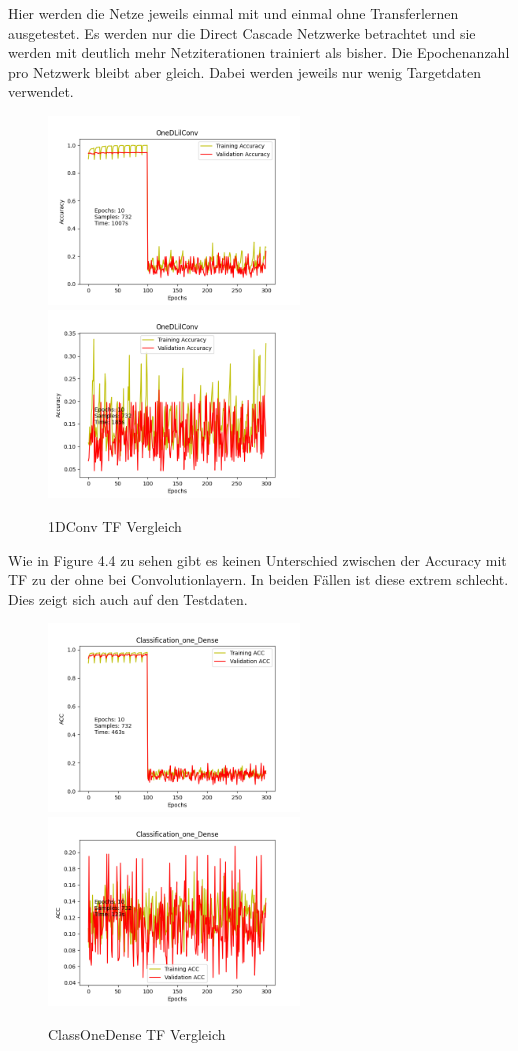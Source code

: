 Hier werden die Netze jeweils einmal mit und einmal ohne Transferlernen ausgetestet. Es werden nur die Direct Cascade Netzwerke betrachtet und 
sie werden mit deutlich mehr Netziterationen trainiert als bisher. Die Epochenanzahl pro Netzwerk bleibt aber gleich. Dabei werden jeweils nur 
wenig Targetdaten verwendet. 

\begin{figure}[htpb]
    \includegraphics[height=5cm]{../../Plots/ba_plots/classTF/1dc_tr.png}
    \includegraphics[height=5cm]{../../Plots/ba_plots/classTF/wo1dc_tr.png}
    \caption{\label{fig:1dc_tr} 1DConv TF Vergleich}
\end{figure}

Wie in Figure 4.4 zu sehen gibt es keinen Unterschied zwischen der Accuracy mit TF zu der ohne bei Convolutionlayern. In beiden Fällen ist diese 
extrem schlecht. Dies zeigt sich auch auf den Testdaten. 

\begin{figure}[htpb]
    \includegraphics[height=5cm]{../../Plots/ba_plots/classTF/cod_tr.png}
    \includegraphics[height=5cm]{../../Plots/ba_plots/classTF/wocod_tr.png}
    \caption{\label{fig:cod_tr} ClassOneDense TF Vergleich}
\end{figure}

